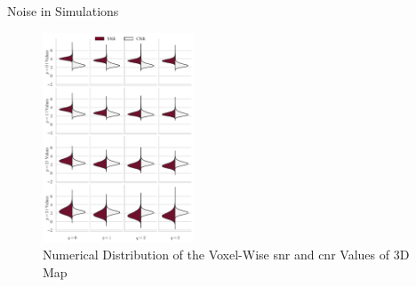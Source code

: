 \documentclass{beamer}
\begin{document}
\begin{frame}{Noise in Simulations}
\begin{figure}
\centering
\includegraphics[width=0.4\textwidth]{Images/cnrsnr3D.png}
\caption{Numerical Distribution of the Voxel-Wise \gls{snr} and \gls{cnr} Values of 3D Map}
\end{figure}
\end{frame}
\end{document}
